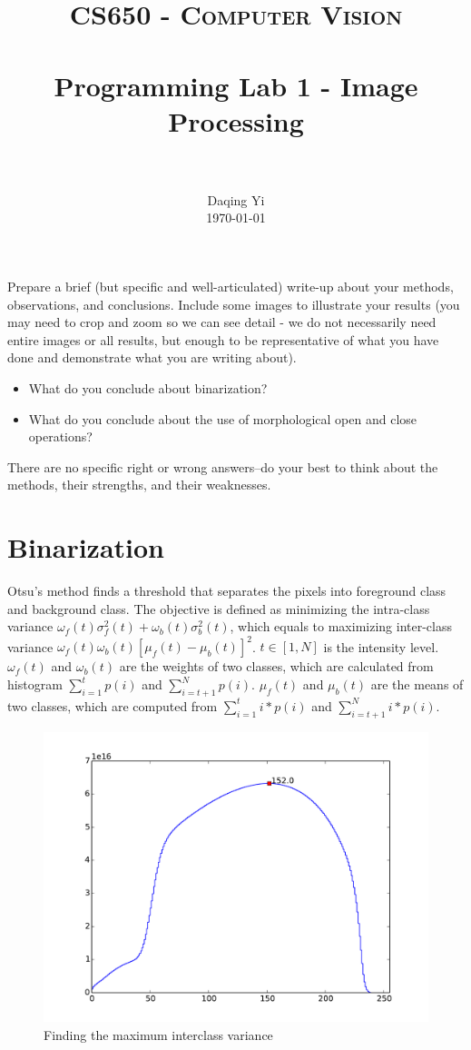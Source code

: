 \documentclass[paper=a4, fontsize=11pt]{scrartcl}
\title{
		\usefont{OT1}{bch}{b}{n}
		\normalfont \normalsize \textsc{CS650 - Computer Vision} \\ [25pt]
		\horrule{0.5pt} \\[0.4cm]
		\huge Programming Lab 1 - Image Processing \\
		\horrule{2pt} \\[0.5cm]
}
\author{
		\normalfont 								\normalsize
        Daqing Yi\\[-3pt]		\normalsize
        \today
}
\date{}
\numberwithin{equation}{section}		%
\numberwithin{figure}{section}			%
\numberwithin{table}{section}				%
\begin{document}
\maketitle

Prepare a brief (but specific and well-articulated) write-up about your methods, observations, and conclusions.
Include some images to illustrate your results (you may need to crop and zoom so we can see detail - we do not necessarily need entire images or all results, but enough to be representative of what you have done and demonstrate what you are writing about).

\begin{itemize}
\item What do you conclude about binarization? 
\item What do you conclude about the use of morphological open and close operations?
\end{itemize}

There are no specific right or wrong answers--do your best to think about the methods, their strengths, and their weaknesses.

\section{Binarization}

Otsu's method finds a threshold that separates the pixels into foreground class and background class.
The objective is defined as minimizing the intra-class variance $ \omega_{f} (t) \sigma_{f}^{2} (t) + \omega_{b} (t) \sigma_{b}^{2} (t) $, which equals to maximizing inter-class variance $ \omega_{f} (t) \omega_{b} (t) [ \mu_{f} (t) - \mu_{b} (t) ]^{2} $.
$ t \in [1, N] $ is the intensity level.
$ \omega_{f} (t) $ and $ \omega_{b} (t) $ are the weights of two classes, which are calculated from histogram $ \sum_{i=1}^{t} p(i) $ and $ \sum_{i=t+1}^{N} p(i) $.
$ \mu_{f} (t) $ and $ \mu_{b} (t) $ are the means of two classes, which are computed from $ \sum_{i=1}^{t} i * p(i) $ and $ \sum_{i=t+1}^{N} i * p(i) $.

\begin{figure}
\centering
\includegraphics[width=0.6\linewidth]{./figure/interclass_variances}
\caption{Finding the maximum interclass variance}
\label{fig:interclass_variances}
\end{figure}
\end{document}
